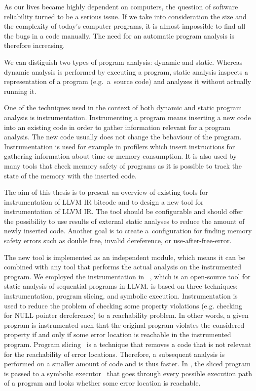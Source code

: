 As our lives became highly dependent on computers, the question of software
reliability turned to be a serious issue. If we take into consideration the
size and the complexity of today's computer programs, it is almost impossible
to find all the bugs in a code manually. The need for an automatic program
analysis is therefore increasing.

We can distiguish two types of program analysis: dynamic and static. Whereas
dynamic analysis is performed by executing a program, static analysis
inspects a representation of a program (e.g.~a~source code) and analyzes it
without actually running it.

One of the techniques used in the context of both dynamic and static program
analysis is instrumentation. Instrumenting a program means inserting a new code
into an existing code in order to gather information relevant for a program
analysis. The new code usually does not change the behaviour of the program.
Instrumentation is used for example in profilers which insert instructions for
gathering information about time or memory consumption. It is also used by many
tools that check memory safety of programs as it is possible to track the state
of the memory with the inserted code.

The aim of this thesis is to present an overview of existing tools for
instrumentation of LLVM IR bitcode and to design a new tool for
instrumentation of LLVM IR. The tool should be configurable and should offer the
possibility to use results of external static analyses to reduce the amount of
newly inserted code. Another goal is to create a~configuration for finding
memory safety errors such as double free, invalid dereference, or
use-after-free-error.

The new tool is implemented as an independent module, which means it can be
combined with any tool that performs the actual analysis on the instrumented
program. We employed the instrumentation in \symbiotic~\cite{Symbiotic}, which
is an open-source tool for static analysis of sequential programs in LLVM.
\symbiotic is based on three techniques: instrumentation, program slicing, and
symbolic execution. Instrumentation is used to reduce the problem of checking
some property violations (e.g. checking for NULL pointer dereference) to a
reachability problem. In other words, a given program is instrumented such that
the original program violates the considered property if and only if some error
location is reachable in the instrumented program. Program
slicing~\cite{weiser} is a technique that removes a code that is not relevant
for the reachability of error locations. Therefore, a subsequent analysis is
performed on a smaller amount of code and is thus faster. In \symbiotic,
the sliced program is passed to a symbolic executor~\cite{King} that goes
through every possible execution path of a program and looks whether some
error location is reachable.


